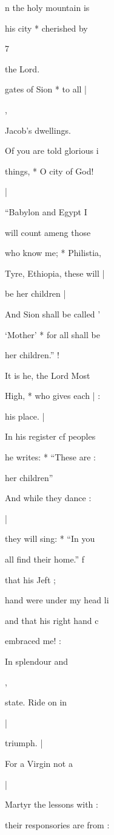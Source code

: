 \documentclass{breviary}
\begin{document}
\begin{brevbody}
n the holy mountain is

his city * cherished by

7

the Lord.

gates of Sion * to all |

,

Jacob’s dwellings.

Of you are told glorious i

things, * O city of God!

|

“Babylon and Egypt I

will count ameng those

who know me; * Philistia,

Tyre, Ethiopia, these will |

be her children |

And Sion shall be called '

‘Mother’ * for all shall be

her children.” !

It is he, the Lord Most

High, * who gives each | :

his place. |

In his register cf peoples

he writes: * “These are :

her children”

And while they dance :

|

they will sing: * “In you

all find their home.” f

\vers{} that his Jeft ;

%
hand were under my head li

and that his right hand c

embraced me! :

In splendour and

,

\vers{} state. Ride on in

|

\resp{} triumph. |

\begin{rubricpar}
For a Virgin not a

\end{rubricpar}
|

\begin{rubricpar}
Martyr the lessons with :

their responsories are from :


\end{rubricpar}
\end{brevbody}
\end{document}
